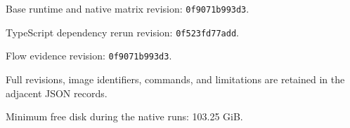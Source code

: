 Base runtime and native matrix revision: \texttt{0f9071b993d3}.

TypeScript dependency rerun revision: \texttt{0f523fd77add}.

Flow evidence revision: \texttt{0f9071b993d3}.

Full revisions, image identifiers, commands, and limitations are retained in the adjacent JSON records.

Minimum free disk during the native runs: 103.25 GiB.
